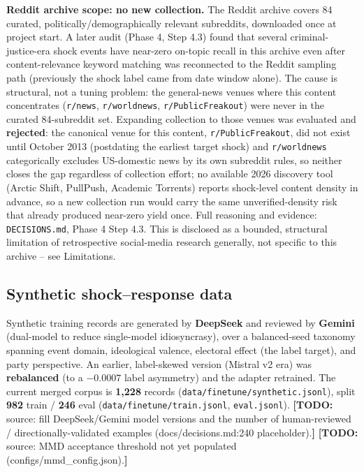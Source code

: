 \documentclass[11pt]{article}
\newcommand{\todo}[1]{{\color{red}\textbf{[TODO:} #1\textbf{]}}}
\begin{document}
\textbf{Reddit archive scope: no new collection.} The Reddit archive covers 84
curated, politically/demographically relevant subreddits, downloaded once at
project start. A later audit (Phase 4, Step 4.3) found that several
criminal-justice-era shock events have near-zero on-topic recall in this
archive even after content-relevance keyword matching was reconnected to the
Reddit sampling path (previously the shock label came from date window alone).
The cause is structural, not a tuning problem: the general-news venues where
this content concentrates (\texttt{r/news}, \texttt{r/worldnews},
\texttt{r/PublicFreakout}) were never in the curated 84-subreddit set.
Expanding collection to those venues was evaluated and \textbf{rejected}: the
canonical venue for this content, \texttt{r/PublicFreakout}, did not exist
until October 2013 (postdating the earliest target shock) and \texttt{r/worldnews}
categorically excludes US-domestic news by its own subreddit rules, so neither
closes the gap regardless of collection effort; no available 2026 discovery
tool (Arctic Shift, PullPush, Academic Torrents) reports shock-level content
density in advance, so a new collection run would carry the same
unverified-density risk that already produced near-zero yield once. Full
reasoning and evidence: \texttt{DECISIONS.md}, Phase 4 Step 4.3. This is
disclosed as a bounded, structural limitation of retrospective social-media
research generally, not specific to this archive -- see Limitations.

\subsection{Synthetic shock--response data}
Synthetic training records are generated by \textbf{DeepSeek} and reviewed by
\textbf{Gemini} (dual-model to reduce single-model idiosyncrasy), over a
balanced-seed taxonomy spanning event domain, ideological valence, electoral
effect (the label target), and party perspective. An earlier, label-skewed
version (Mistral v2 era) was \textbf{rebalanced} (to a $-0.0007$ label
asymmetry) and the adapter retrained. The current merged corpus is
\textbf{1{,}228} records (\texttt{data/finetune/synthetic.jsonl}), split
\textbf{982} train / \textbf{246} eval (\texttt{data/finetune/train.jsonl},
\texttt{eval.jsonl}).
\todo{source: fill DeepSeek/Gemini model versions and the number of
human-reviewed / directionally-validated examples (docs/decisions.md:240
placeholder).}
\todo{source: MMD acceptance threshold not yet populated (configs/mmd\_config.json).}
\end{document}
